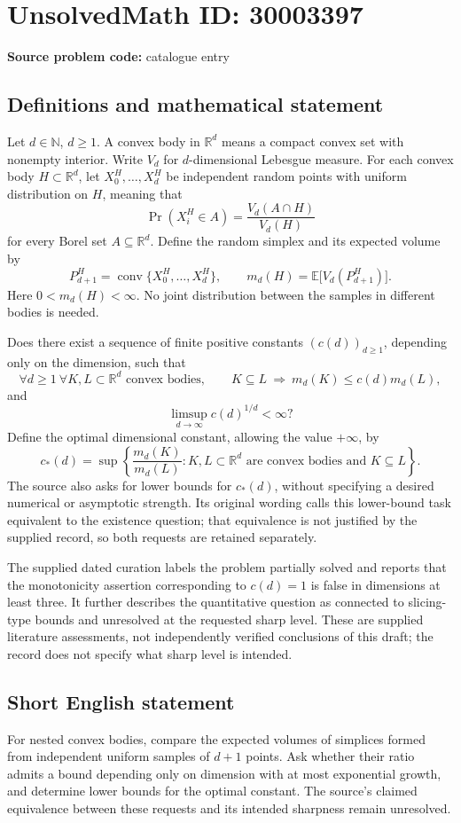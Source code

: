 \documentclass[11pt]{article}
\newcommand{\N}{\mathbb{N}}
\newcommand{\R}{\mathbb{R}}
\newcommand{\E}{\mathbb{E}}
\begin{document}
\section*{UnsolvedMath ID: 30003397}
\textbf{Source problem code:} catalogue entry
\subsection{Definitions and mathematical statement}
Let \(d\in\N\), \(d\geq1\). A convex body in \(\R^d\) means a compact convex set with nonempty interior. Write \(V_d\) for \(d\)-dimensional Lebesgue measure. For each convex body \(H\subset\R^d\), let \(X_0^H,\ldots,X_d^H\) be independent random points with uniform distribution on \(H\), meaning that
\[
\Pr(X_i^H\in A)=\frac{V_d(A\cap H)}{V_d(H)}
\]
for every Borel set \(A\subseteq\R^d\). Define the random simplex and its expected volume by
\[
P_{d+1}^H=\operatorname{conv}\{X_0^H,\ldots,X_d^H\},
\qquad m_d(H)=\E\bigl[V_d(P_{d+1}^H)\bigr].
\]
Here \(0<m_d(H)<\infty\). No joint distribution between the samples in different bodies is needed.

Does there exist a sequence of finite positive constants \((c(d))_{d\geq1}\), depending only on the dimension, such that
\[
\forall d\geq1\ \forall K,L\subset\R^d\text{ convex bodies},\qquad
K\subseteq L\ \Longrightarrow\ m_d(K)\leq c(d)m_d(L),
\]
and
\[
\limsup_{d\to\infty}c(d)^{1/d}<\infty?
\]
Define the optimal dimensional constant, allowing the value \(+\infty\), by
\[
c_*(d)=\sup\left\{\frac{m_d(K)}{m_d(L)}:
K,L\subset\R^d\text{ are convex bodies and }K\subseteq L\right\}.
\]
The source also asks for lower bounds for \(c_*(d)\), without specifying a desired numerical or asymptotic strength. Its original wording calls this lower-bound task equivalent to the existence question; that equivalence is not justified by the supplied record, so both requests are retained separately.

The supplied dated curation labels the problem partially solved and reports that the monotonicity assertion corresponding to \(c(d)=1\) is false in dimensions at least three. It further describes the quantitative question as connected to slicing-type bounds and unresolved at the requested sharp level. These are supplied literature assessments, not independently verified conclusions of this draft; the record does not specify what sharp level is intended.
\subsection{Short English statement}
For nested convex bodies, compare the expected volumes of simplices formed from independent uniform samples of \(d+1\) points. Ask whether their ratio admits a bound depending only on dimension with at most exponential growth, and determine lower bounds for the optimal constant. The source's claimed equivalence between these requests and its intended sharpness remain unresolved.
\end{document}
